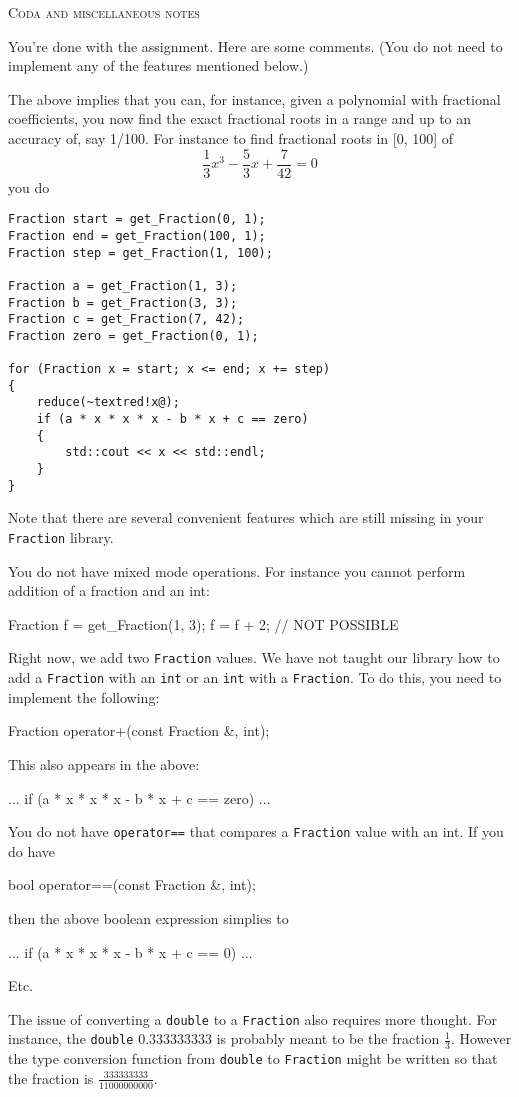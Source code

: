 \textsc{Coda and miscellaneous notes}

You're done with the assignment.
Here are some comments.
(You do not need to implement any of the features mentioned below.)

The above implies that you can, for instance,
given a polynomial with fractional coefficients,
you
now find the exact fractional roots in a range and
up to an accuracy of, say 1/100.
For instance to find fractional roots in [0, 100]
of  
\[
\frac{1}{3} x^3 - \frac{5}{3} x + \frac{7}{42} = 0
\]
you do
\begin{Verbatim}[frame=single,fontsize=\small,commandchars=\~\!\@]
Fraction start = get_Fraction(0, 1);
Fraction end = get_Fraction(100, 1);
Fraction step = get_Fraction(1, 100);

Fraction a = get_Fraction(1, 3);
Fraction b = get_Fraction(3, 3);
Fraction c = get_Fraction(7, 42);
Fraction zero = get_Fraction(0, 1);

for (Fraction x = start; x <= end; x += step)
{
    reduce(~textred!x@);
    if (a * x * x * x - b * x + c == zero)
    {
        std::cout << x << std::endl;
    }
}
\end{Verbatim}

Note that there are several convenient features which are
still missing in your \verb!Fraction! library.

You do not have mixed mode operations.
For instance you cannot perform addition of a fraction and an int:
\begin{console}
Fraction f = get_Fraction(1, 3);
f = f + 2; // NOT POSSIBLE
\end{console}
Right now, we add two \verb!Fraction! values.
We have not taught our library
how to add a \verb!Fraction! with an \verb!int! or an \verb!int! with a
\verb!Fraction!.
To do this, 
you need to implement the following:
\begin{console}
Fraction operator+(const Fraction &, int);
\end{console}
This also appears in the above:
\begin{console}
...
    if (a * x * x * x - b * x + c == zero)
...
\end{console}
You do not have \verb!operator==! that compares a \verb!Fraction! value with an
int.
If you do have
\begin{console}
bool operator==(const Fraction &, int);
\end{console}
then the above boolean expression simplies to
\begin{console}
...
    if (a * x * x * x - b * x + c == 0)
...
\end{console}

Etc.

The issue of converting a \verb!double! to a \verb!Fraction! also requires more
thought. For instance, the \verb!double! $0.333333333$ is probably meant to
be the fraction $\frac{1}{3}$. However the type conversion function from
\verb!double! to \verb!Fraction! might be written so that the fraction is
$\frac{333333333}{11000000000}$.
